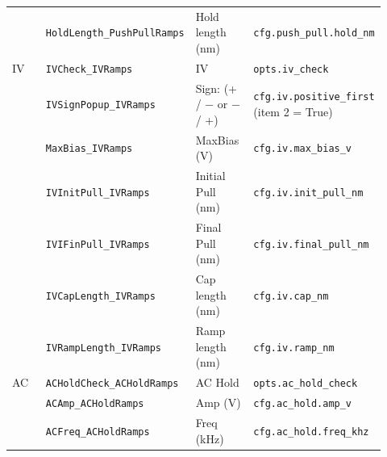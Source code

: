 \begin{longtable}{@{}>{\raggedright\arraybackslash}p{0.230\linewidth}>{\raggedright\arraybackslash}p{0.230\linewidth}>{\raggedright\arraybackslash}p{0.230\linewidth}>{\raggedright\arraybackslash}p{0.230\linewidth}@{}}
 & \texttt{Hold\discretionary{}{}{}Length\_\discretionary{}{}{}Push\discretionary{}{}{}Pull\discretionary{}{}{}Ramps} & Hold length (nm) & \texttt{cfg.\discretionary{}{}{}push\_\discretionary{}{}{}pull.\discretionary{}{}{}hold\_\discretionary{}{}{}nm} \\
IV & \texttt{IVCheck\_\discretionary{}{}{}IVRamps} & IV & \texttt{opts.\discretionary{}{}{}iv\_\discretionary{}{}{}check} \\
 & \texttt{IVSign\discretionary{}{}{}Popup\_\discretionary{}{}{}IVRamps} & Sign: (+ / − or − / +) & \texttt{cfg.\discretionary{}{}{}iv.\discretionary{}{}{}positive\_\discretionary{}{}{}first} (item 2 = True) \\
 & \texttt{Max\discretionary{}{}{}Bias\_\discretionary{}{}{}IVRamps} & MaxBias (V) & \texttt{cfg.\discretionary{}{}{}iv.\discretionary{}{}{}max\_\discretionary{}{}{}bias\_\discretionary{}{}{}v} \\
 & \texttt{IVInit\discretionary{}{}{}Pull\_\discretionary{}{}{}IVRamps} & Initial Pull (nm) & \texttt{cfg.\discretionary{}{}{}iv.\discretionary{}{}{}init\_\discretionary{}{}{}pull\_\discretionary{}{}{}nm} \\
 & \texttt{IVIFin\discretionary{}{}{}Pull\_\discretionary{}{}{}IVRamps} & Final Pull (nm) & \texttt{cfg.\discretionary{}{}{}iv.\discretionary{}{}{}final\_\discretionary{}{}{}pull\_\discretionary{}{}{}nm} \\
 & \texttt{IVCap\discretionary{}{}{}Length\_\discretionary{}{}{}IVRamps} & Cap length (nm) & \texttt{cfg.\discretionary{}{}{}iv.\discretionary{}{}{}cap\_\discretionary{}{}{}nm} \\
 & \texttt{IVRamp\discretionary{}{}{}Length\_\discretionary{}{}{}IVRamps} & Ramp length (nm) & \texttt{cfg.\discretionary{}{}{}iv.\discretionary{}{}{}ramp\_\discretionary{}{}{}nm} \\
AC & \texttt{ACHold\discretionary{}{}{}Check\_\discretionary{}{}{}ACHold\discretionary{}{}{}Ramps} & AC Hold & \texttt{opts.\discretionary{}{}{}ac\_\discretionary{}{}{}hold\_\discretionary{}{}{}check} \\
 & \texttt{ACAmp\_\discretionary{}{}{}ACHold\discretionary{}{}{}Ramps} & Amp (V) & \texttt{cfg.\discretionary{}{}{}ac\_\discretionary{}{}{}hold.\discretionary{}{}{}amp\_\discretionary{}{}{}v} \\
 & \texttt{ACFreq\_\discretionary{}{}{}ACHold\discretionary{}{}{}Ramps} & Freq (kHz) & \texttt{cfg.\discretionary{}{}{}ac\_\discretionary{}{}{}hold.\discretionary{}{}{}freq\_\discretionary{}{}{}khz} \\

\end{longtable}
